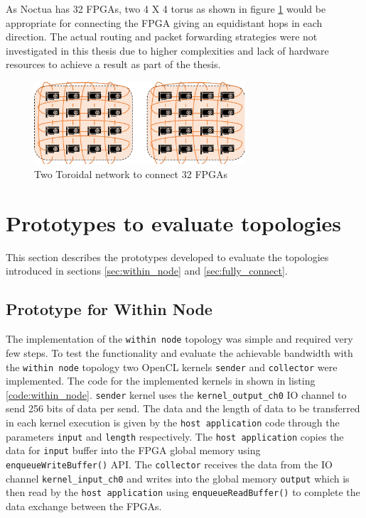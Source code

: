 As Noctua has 32 FPGAs, two 4 X 4 torus as shown in figure \ref{fig:toroidal}
would be appropriate for connecting the FPGA giving an equidistant
hops in each direction. The actual routing and packet forwarding strategies
were not investigated in this thesis due to higher complexities
and lack of hardware resources to achieve a result as part of the thesis.

\begin{figure}[h]%
    \centering
    \includegraphics[width=0.7\textwidth]{images/torus}
    \caption{Two Toroidal network to connect 32 FPGAs}
    \label{fig:toroidal}
\end{figure}

\section{Prototypes to evaluate topologies}
\label{sec:proto_topo}

This section describes the prototypes developed to evaluate the topologies
introduced in sections \ref{sec:within_node} and \ref{sec:fully_connect}.

\subsection{Prototype for Within Node}

The implementation of the \texttt{within node} topology was simple and required very few
steps. To test the functionality and evaluate the achievable bandwidth with the
\texttt{within node} topology two OpenCL kernels \texttt{sender} and \texttt{collector}
were implemented. The code for the implemented kernels in shown in listing
\ref{code:within_node}. \texttt{sender} kernel uses the
\texttt{kernel\_output\_ch0} IO channel to send 256 bits of data per send.
The data and the length of data to be transferred in each kernel execution
is given by the \texttt{host application} code through the parameters \texttt{input} and
\texttt{length} respectively. The \texttt{host application} copies the data for \texttt{input}
buffer into the FPGA global memory using \texttt{enqueueWriteBuffer()} API.
The \texttt{collector} receives the data from the IO channel \texttt{kernel\_input\_ch0}
and writes into the global memory \texttt{output} which
is then read by the \texttt{host application} using \texttt{enqueueReadBuffer()} to complete
the data exchange between the FPGAs.

